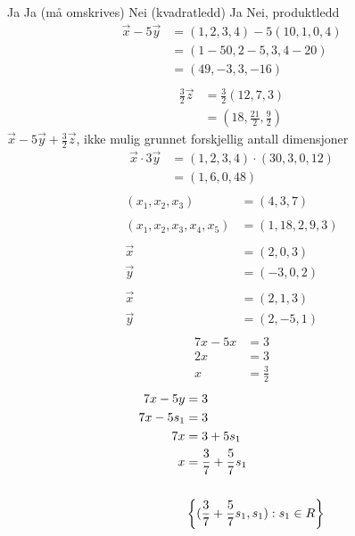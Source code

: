 

Ja
Ja (må omskrives)
Nei (kvadratledd)
Ja
Nei, produktledd
\begin{align*}
\vec{x} -5\vec{y}&=(1,2,3,4)-5(10,1,0,4)\\
                 &=(1-50,2-5, 3, 4-20)\\
                 &=(49, -3, 3, -16)\\
\end{align*}
\begin{align*}
  \frac{3}{2}\vec{z} &= \frac{3}{2}(12,7,3)\\
                     &= (18, \frac{21}{2}, \frac{9}{2})
\end{align*}
$\vec{x}-5\vec{y}+\frac{3}{2}\vec{z}$, ikke mulig grunnet forskjellig antall dimensjoner
\begin{align*}
  \vec{x}\cdot 3 \vec{y}&=(1,2,3,4)\cdot (30,3,0,12)\\
                        &=(1,6,0,48)\\
\end{align*}
\begin{align*}
  (x_1, x_2, x_3) &=  (4,3,7)\\
  \\
  (x_1, x_2, x_3, x_4, x_5) &= (1,18,2,9,3)\\
  \\
  \vec{x} &= (2,0,3)\\
  \vec{y} &= (-3, 0, 2)\\
  \\
  \vec{x} &= (2,1,3)\\
  \vec{y} &= (2,-5,1)\\
\end{align*}
\begin{align*}
  7x-5x &= 3\\
  2x &= 3\\
  x &= \frac{3}{2}
\end{align*}
\begin{align*}
  7x-5y &= 3\\
  7x-5s_1&= 3\\
  7x &= 3+5s_1\\
  x &= \frac{3}{7} + \frac{5}{7}s_1\\
  \\
  &\left\{ (\frac{3}{7} + \frac{5}{7}s_1, s_1) : s_1 \in R \right \}\\
\end{align*}
